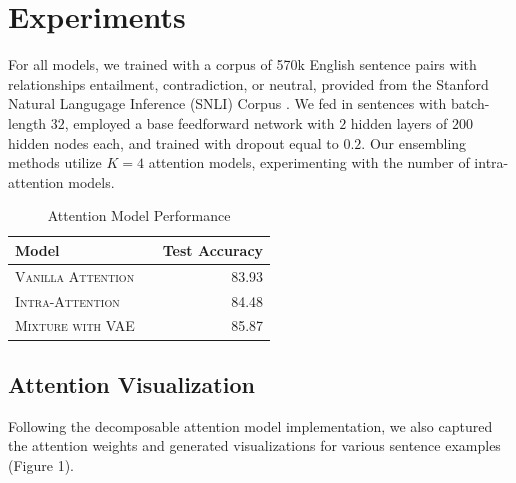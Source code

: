 \documentclass[11pt]{article}
\begin{document}

\section{Experiments}

For all models, we trained with a corpus of 570k English sentence pairs with relationships entailment, contradiction, or neutral, provided from the Stanford Natural Langugage Inference (SNLI) Corpus \citep{snli:emnlp2015}. We fed in sentences with batch-length $32$, employed a base feedforward network with $2$ hidden layers of $200$ hidden nodes each, and trained with dropout equal to $0.2$. Our ensembling methods utilize $K = 4$ attention models, experimenting with the number of intra-attention models.


\begin{table}[h]
\centering
\begin{tabular}{llr}
 \toprule
 Model &  & Test Accuracy \\
 \midrule
 \textsc{Vanilla Attention} & & 83.93\\
 \textsc{Intra-Attention} & & 84.48 \\
 \textsc{Mixture with VAE} & & 85.87 \\
 \bottomrule
\end{tabular}
\caption{\label{tab:results} Attention Model Performance}
\end{table}

\subsection{Attention Visualization}

Following the decomposable attention model implementation, we also captured the attention weights and generated visualizations for various sentence examples (Figure 1). 
\end{document}
